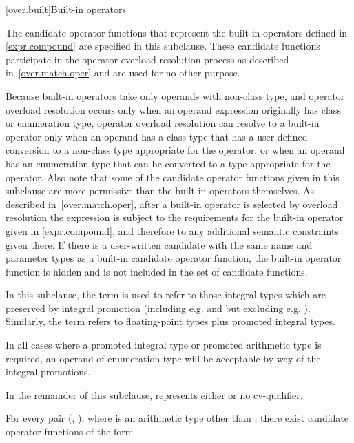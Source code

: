 [over.built]{Built-in operators}%

\pnum
The candidate operator functions that represent the built-in operators
defined in \ref{expr.compound} are specified in this subclause.
These candidate
functions participate in the operator overload resolution process as
described in~\ref{over.match.oper} and are used for no other purpose.
\begin{note}
Because built-in operators take only operands with non-class type,
and operator overload resolution occurs only when an operand expression
originally has class or enumeration type,
operator overload resolution can resolve to a built-in operator only
when an operand has a class type that has a user-defined conversion to
a non-class type appropriate for the operator, or when an operand has
an enumeration type that can be converted to a type appropriate
for the operator.
Also note that some of the candidate operator functions given in this subclause are
more permissive than the built-in operators themselves.
As
described in~\ref{over.match.oper}, after a built-in operator is selected
by overload resolution the expression is subject to the requirements for
the built-in operator given in \ref{expr.compound}, and therefore to any
additional semantic constraints given there.
If there is a user-written
candidate with the same name and parameter types as a built-in
candidate operator function, the built-in operator function
is hidden and is not included in the set of candidate functions.
\end{note}

\pnum
{}%
%
In this subclause, the term
is used to refer to those integral types which are preserved by
integral promotion (including e.g.
and
but excluding e.g.
).
Similarly, the term
refers to floating-point types plus promoted integral types.
\begin{note}
In all cases where a promoted integral type or promoted arithmetic type is
required, an operand of enumeration type will be acceptable by way of the
integral promotions.
\end{note}

\pnum
In the remainder of this subclause,  represents either
 or no cv-qualifier.

\pnum
For every pair
(,
),
where
is an arithmetic type other than ,
there exist candidate operator functions of the form

